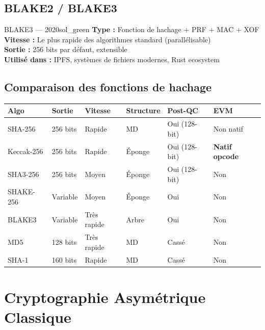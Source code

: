 \documentclass[12pt, a4paper]{article}
\begin{document}
\subsection{BLAKE2 / BLAKE3}

\begin{algobox}{BLAKE3 --- 2020}{sol_green}
\textbf{Type :} Fonction de hachage + PRF + MAC + XOF\\
\textbf{Vitesse :} Le plus rapide des algorithmes standard (parallélisable)\\
\textbf{Sortie :} 256 bits par défaut, extensible\\
\textbf{Utilisé dans :} IPFS, systèmes de fichiers modernes, Rust ecosystem
\end{algobox}

\subsection{Comparaison des fonctions de hachage}

\begin{center}
\renewcommand{\arraystretch}{1.4}
\begin{tabular}{llllll}
  \toprule
  \textbf{Algo} & \textbf{Sortie} & \textbf{Vitesse} & \textbf{Structure} & \textbf{Post-QC} & \textbf{EVM} \\
  \midrule
  SHA-256 & 256 bits & Rapide & MD & Oui (128-bit) & Non natif \\
  Keccak-256 & 256 bits & Rapide & Éponge & Oui (128-bit) & \textbf{Natif opcode} \\
  SHA3-256 & 256 bits & Moyen & Éponge & Oui (128-bit) & Non \\
  SHAKE-256 & Variable & Moyen & Éponge & Oui & Non \\
  BLAKE3 & Variable & Très rapide & Arbre & Oui & Non \\
  MD5 & 128 bits & Très rapide & MD & \textcolor{danger_red}{Cassé} & Non \\
  SHA-1 & 160 bits & Rapide & MD & \textcolor{danger_red}{Cassé} & Non \\
  \bottomrule
\end{tabular}
\end{center}

\section{Cryptographie Asymétrique Classique}
\end{document}
